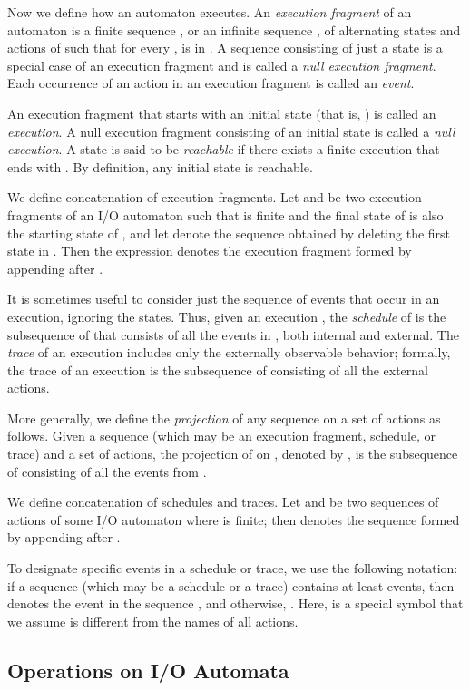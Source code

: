 \documentclass[11pt]{article}
\numberwithin{theorem}{section}
\begin{document}
Now we define how an automaton executes. 
An \emph{execution fragment} of an automaton  is a finite sequence
, or an infinite sequence
, of alternating
states and actions of  such that for every ,  is in .
A sequence consisting of just a state is a special case of an
execution fragment and is called a \emph{null execution fragment}. 
Each occurrence of an action in an execution fragment is called an 
\emph{event}. 

An execution fragment that starts with an initial state (that is, ) is called an \emph{execution}. 
A null execution fragment consisting of an initial state is called a
\emph{null execution}.
A state  is said to be \emph{reachable} if there exists a finite
execution that ends with . 
By definition, any initial state is reachable.

We define concatenation of execution fragments.
Let  and  be two execution fragments of an I/O
automaton such that  is finite and the final state of
 is also the starting state of , and let
 denote the sequence obtained by deleting the first state
in . 
Then the expression  denotes the execution
fragment formed by appending  after .

It is sometimes useful to consider just the sequence of events that
occur in an execution, ignoring the states.
Thus, given an execution , the \emph{schedule} of  is
the subsequence of  that consists of all the events in
, both internal and external.
The \emph{trace} of an execution includes only the externally
observable behavior;
formally, the trace  of an execution  is the subsequence of
 consisting of all the external actions. 

More generally, we define the \emph{projection} of any sequence on a
set of actions as follows.
Given a sequence  (which may be an execution fragment, schedule, or
trace) and a set  of actions, the projection of  on , denoted
by , is the subsequence of  consisting of all the events from
.


We define concatenation of schedules and traces. 
Let  and  be two sequences of actions of some I/O automaton
where  is finite; then  denotes the sequence
formed by appending  after .

To designate specific events in a schedule or trace, we use the
following notation:
if a sequence  (which may be a schedule or a trace) contains at
least  events, then  denotes the  event in the
sequence , and otherwise, . 
Here,  is a special symbol that we assume is different from the
names of all actions. 

\subsection{Operations on I/O Automata}
\end{document}
